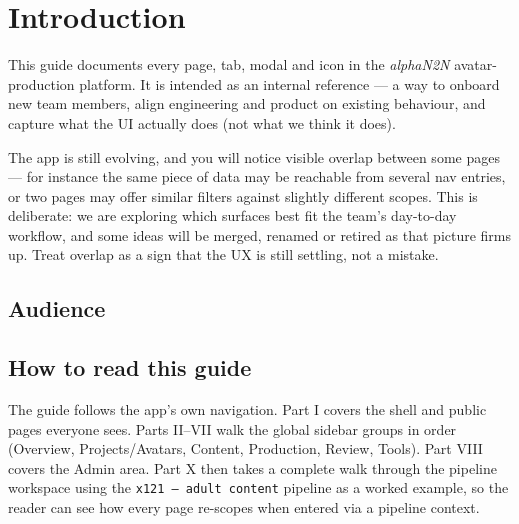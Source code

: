 \chapter{Introduction}
\label{ch:introduction}

This guide documents every page, tab, modal and icon in the \emph{alphaN2N}
avatar-production platform. It is intended as an internal reference — a way to
onboard new team members, align engineering and product on existing behaviour,
and capture what the UI actually does (not what we think it does).

\begin{designnote}
The app is still evolving, and you will notice visible overlap between some
pages — for instance the same piece of data may be reachable from several
nav entries, or two pages may offer similar filters against slightly
different scopes. This is deliberate: we are exploring which surfaces best
fit the team's day-to-day workflow, and some ideas will be merged, renamed
or retired as that picture firms up. Treat overlap as a sign that the UX is
still settling, not a mistake.
\end{designnote}

\section{Audience}
\label{sec:intro-audience}

\begin{itemize}
\end{itemize}

\section{How to read this guide}
\label{sec:intro-how-to-read}

The guide follows the app's own navigation. Part I covers the shell and public
pages everyone sees. Parts II–VII walk the global sidebar groups in order
(Overview, Projects/Avatars, Content, Production, Review, Tools). Part VIII
covers the Admin area. Part X then takes a complete walk through the pipeline
workspace using the \texttt{x121 — adult content} pipeline as a worked example,
so the reader can see how every page re-scopes when entered via a pipeline
context.

